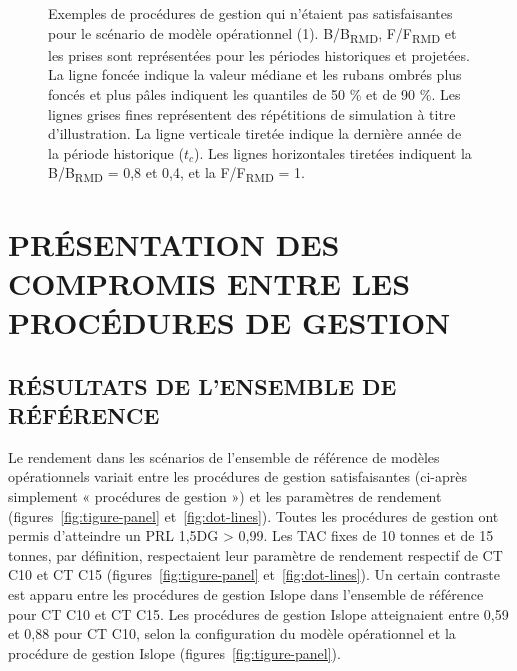 \documentclass[11pt]{book}
\begin{document}
\begin{figure}[htb]

{\centering {} 

}

\caption{Exemples de procédures de gestion qui n'étaient pas satisfaisantes pour le scénario de modèle opérationnel (1). B/B\textsubscript{RMD}, F/F\textsubscript{RMD} et les prises sont représentées pour les périodes historiques et projetées. La ligne foncée indique la valeur médiane et les rubans ombrés plus foncés et plus pâles indiquent les quantiles de 50 \% et de 90 \%. Les lignes grises fines représentent des répétitions de simulation à titre d'illustration. La ligne verticale tiretée indique la dernière année de la période historique (\(t_c\)). Les lignes horizontales tiretées indiquent la B/B\textsubscript{RMD} = 0,8 et 0,4, et la F/F\textsubscript{RMD} = 1.}\label{fig:proj-not-satisficed-eg}
\end{figure}
\clearpage

\hypertarget{sec:results}{%
\section{PRÉSENTATION DES COMPROMIS ENTRE LES PROCÉDURES DE GESTION}\label{sec:results}}

\hypertarget{ruxe9sultats-de-lensemble-de-ruxe9fuxe9rence}{%
\subsection{RÉSULTATS DE L'ENSEMBLE DE RÉFÉRENCE}\label{ruxe9sultats-de-lensemble-de-ruxe9fuxe9rence}}

Le rendement dans les scénarios de l'ensemble de référence de modèles opérationnels variait entre les procédures de gestion satisfaisantes (ci-après simplement « procédures de gestion ») et les paramètres de rendement (figures~\ref{fig:tigure-panel} et~\ref{fig:dot-lines}). Toutes les procédures de gestion ont permis d'atteindre un PRL 1,5DG \textgreater{} 0,99. Les TAC fixes de 10 tonnes et de 15 tonnes, par définition, respectaient leur paramètre de rendement respectif de CT C10 et CT C15 (figures~\ref{fig:tigure-panel} et~\ref{fig:dot-lines}). Un certain contraste est apparu entre les procédures de gestion Islope dans l'ensemble de référence pour CT C10 et CT C15. Les procédures de gestion Islope atteignaient entre 0,59 et 0,88 pour CT C10, selon la configuration du modèle opérationnel et la procédure de gestion Islope (figures~\ref{fig:tigure-panel}).
\end{document}
